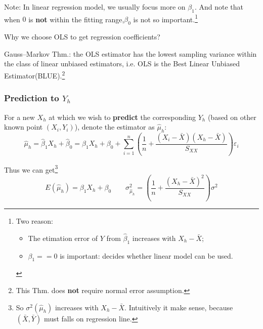         
       
    
    Note: In linear regression model, we usually focus more on $ \beta_1 $. And note that when $ 0 $ is \textbf{not} within the fitting range,$ \beta_0 $ is not so important.\footnote{Two reason:\begin{itemize}[topsep=2pt,itemsep=2pt]
        \item The etimation error of $ Y $ from $ \hat{\beta}_1 $ increases with $ X_h-\bar{X} $;
        \item $ \beta_1==0  $ is important: decides whether linear model can be used. 
    \end{itemize}
    
        }

    Why we choose OLS to get regression coefficients?

\begin{point}
    Gauss–Markov Thm.: the OLS estimator has the lowest sampling variance within the class of linear unbiased estimators, i.e. OLS is the Best Linear Unbiased Estimator(BLUE).\footnote{This Thm. does \textbf{not }require normal error assumption.}
\end{point}
    



\subsubsection{Prediction to $ Y_h $}
    For a new $ X_h $ at which we wish to \textbf{predict }the corresponding $ Y_h $ (based on other known point $ (X_i,Y_i) $), denote the estimator as $ \hat{\mu}_h $:
    \[
        \hat{\mu}_h=\hat{\beta}_1X_h+\hat{\beta}_0 =\beta_1X_h+\beta _0+\sum_{i=1}^n\left( \dfrac{1}{n}+\dfrac{(X_i-\bar{X})(X_h-\bar{X})}{S_{XX}} \right)\varepsilon _i
    \]
    
    Thus we can get\footnote{So $ \sigma ^2(\hat{\mu }_h) $ increases with $ X_h-\bar{X} $. Intuitively it make sense, because $ (\bar{X},\bar{Y})$ must falls on regression line.}
    \[
        E(\hat{\mu}_h)= \beta _1X_h+\beta _0\qquad \sigma ^2_{\hat{\mu}_h}=\left( \dfrac{1}{n}+\dfrac{(X_h-\bar{X})^2}{S_{XX}} \right)\sigma^2
    \]
    
